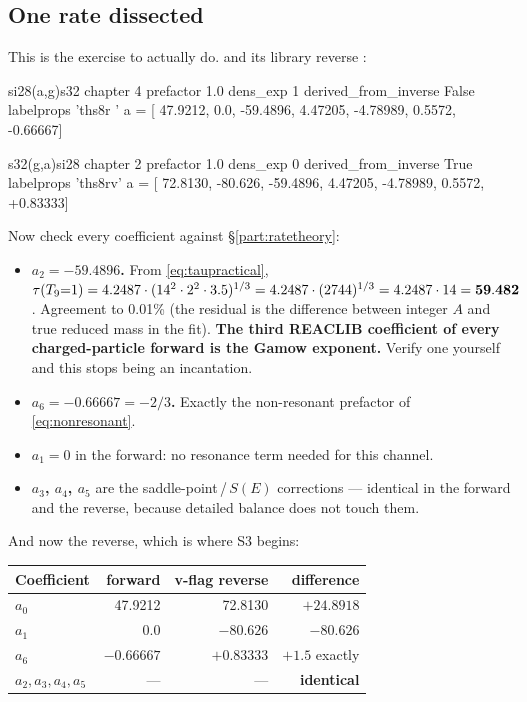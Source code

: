 \subsection{One rate dissected}
\label{sec:onerate}

This is the exercise to actually do.  and its library reverse
\derivedhere{}:

\begin{srclisting}
si28(a,g)s32   chapter 4  prefactor 1.0  dens_exp 1  derived_from_inverse False
   labelprops 'ths8r '
   a = [ 47.9212,   0.0,     -59.4896,  4.47205, -4.78989,  0.5572, -0.66667]

s32(g,a)si28   chapter 2  prefactor 1.0  dens_exp 0  derived_from_inverse True
   labelprops 'ths8rv'
   a = [ 72.8130, -80.626,   -59.4896,  4.47205, -4.78989,  0.5572, +0.83333]
\end{srclisting}

Now check every coefficient against \S\ref{part:ratetheory}:

\begin{itemize}
\item \textbf{$a_2 = -59.4896$.} From \eqref{eq:taupractical},
      $\tau(T_{9}{=}1) = 4.2487\cdot(14^2\cdot2^2\cdot3.5)^{1/3}
      = 4.2487\cdot(2744)^{1/3} = 4.2487\cdot14 = \mathbf{59.482}$. Agreement to
      0.01\% (the residual is the difference between integer $A$ and true
      reduced mass in the fit). \textbf{The third REACLIB coefficient of every
      charged-particle forward is the Gamow exponent.} Verify one yourself and
      this stops being an incantation.
\item \textbf{$a_6 = -0.66667 = -2/3$.} Exactly the non-resonant prefactor of
      \eqref{eq:nonresonant}.
\item \textbf{$a_1 = 0$} in the forward: no resonance term needed for this
      channel.
\item \textbf{$a_3$, $a_4$, $a_5$} are the saddle-point\,/\,$S(E)$ corrections
      --- identical in the forward and the reverse, because detailed balance does
      not touch them.
\end{itemize}

And now the reverse, which is where S3 begins:

\begin{center}
\begin{tabular}{@{}lrrr@{}}
\toprule
\textbf{Coefficient} & \textbf{forward} & \textbf{v-flag reverse}
  & \textbf{difference} \\
\midrule
$a_0$ & 47.9212 & 72.8130 & $\mathbf{+24.8918}$ \\
$a_1$ & 0.0 & $-80.626$ & $\mathbf{-80.626}$ \\
$a_6$ & $-0.66667$ & $+0.83333$ & $\mathbf{+1.5}$ exactly \\
$a_2,a_3,a_4,a_5$ & --- & --- & \textbf{identical} \\
\bottomrule
\end{tabular}
\end{center}

